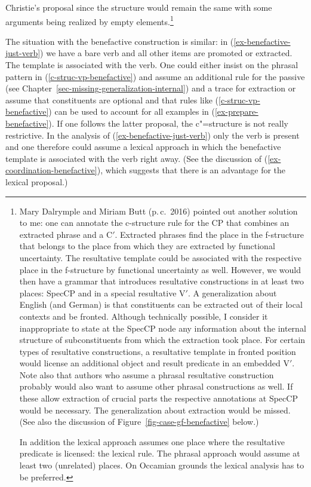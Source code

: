 Christie's proposal since the structure would remain the same with some arguments being realized by empty elements.\footnote{%
    Mary Dalrymple and Miriam Butt (p.\,c.\ 2016) pointed out another solution to me: one can annotate the c-structure
    rule for the CP that combines an extracted phrase and a C$'$. Extracted phrases find the place in
    the f-structure that belongs to the place from which they are extracted by functional
    uncertainty. The resultative template could be associated with the respective place in the
    f-structure by functional uncertainty as well. However, we would then have a grammar that introduces
    resultative constructions in at least two places: SpecCP and in a special resultative V$'$. A
    generalization about English (and German) is that constituents can be extracted out of their local
    contexts and be fronted. Although technically possible, I consider it inappropriate to state at the
    SpecCP node any information about the internal structure of subconstituents from which the
    extraction took place. For certain types of resultative constructions, a resultative template in fronted position would license an additional
    object and result predicate in an embedded V$'$. Note also that authors who assume a phrasal resultative construction probably
    would also want to assume other phrasal constructions as well. If these allow extraction of crucial
    parts the respective annotations at SpecCP would be necessary. The generalization about extraction
    would be missed. (See also the discussion of Figure~\ref{fig-case-gf-benefactive} below.)

    In addition the lexical approach assumes one place where the resultative predicate is licensed: the
    lexical rule. The phrasal approach would assume at least two (unrelated) places. On Occamian grounds
    the lexical analysis has to be preferred. 
}

The situation with the benefactive construction is similar: in (\ref{ex-benefactive-just-verb}) we
have a bare verb and all other items are promoted or extracted. The template is associated with the
verb. One could either insist on the phrasal pattern in (\ref{c-struc-vp-benefactive}) and assume an
additional rule for the passive (see Chapter~\ref{sec-missing-generalization-internal}) and a trace
for extraction or assume that constituents are optional and that rules like
(\ref{c-struc-vp-benefactive}) can be used to account for all examples in
(\ref{ex-prepare-benefactive}). If one follows the latter proposal, the c"=structure is not really
restrictive. In the analysis of (\ref{ex-benefactive-just-verb}) only the verb is present and
one therefore could assume a lexical approach in which the benefactive template is associated with
the verb right away. (See the discussion of (\ref{ex-coordination-benefactive}), which suggests that there is an advantage for
the lexical proposal.)

